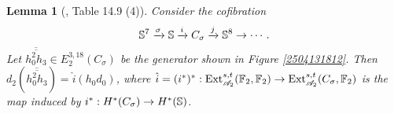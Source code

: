 \documentclass[11pt, titlepage]{article} %
\def\bb{\ensuremath\mathbb}
\def\A{\ensuremath{\mathscr{A}_2}}
\DeclareMathOperator{\Ext}{Ext}
\numberwithin{equation}{subsection}
\theoremstyle{plain}
\newtheorem{lemma}[theorem]{Lemma}
\theoremstyle{definition}
\begin{document}
\begin{lemma}[{\autocite{rognes2}, Table 14.9 (4)}]\label{2504131851}
Consider the cofibration
\[\bb{S}^7 \xrightarrow{\sigma} \bb{S} \xrightarrow{i} C_\sigma \xrightarrow{j} \bb{S}^8\to \cdots.\]
Let \(\overline{\overline{h_0^2h_3}}\in E_2^{3,18}(C_\sigma)\) be the generator shown in Figure \ref{2504131812}. Then \(d_2(\overline{\overline{h_0^2h_3}})=\hat i(h_0d_0)\), where \(\hat i = (i^*)^* : \Ext_{\A}^{s,t}(\bb{F}_2, \bb{F}_2)\to \Ext_{\A}^{s,t}(C_\sigma, \bb{F}_2)\) is the map induced by \(i^* : H^*(C_\sigma)\to H^*(\bb{S})\). %
\end{lemma}
\end{document}
